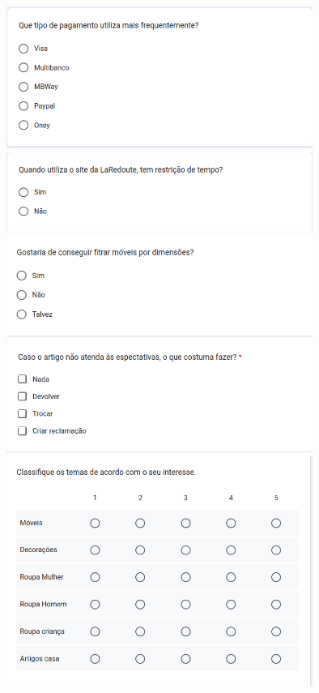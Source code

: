 \documentclass[a4paper,12pt]{article}
\begin{document}
\begin{center}
    \includegraphics[width=0.75\textwidth]{form/10questao_metodopagamento.png}
    \includegraphics[width=0.75\textwidth]{form/11questao_restricaotempo.png}
    \includegraphics[width=0.75\textwidth]{form/12questao_filtrardimensoes.png}
    \includegraphics[width=0.75\textwidth]{form/13questao_expectativas.png}
    \includegraphics[width=0.75\textwidth]{form/14questao_temasinteresse.png}

\end{center}
\end{document}
